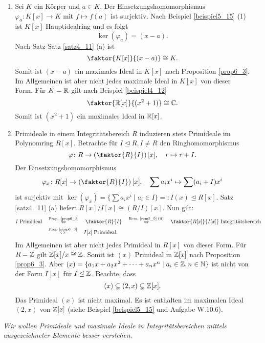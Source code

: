 \begin{beispiel}\label{beispiel6_5}
	\begin{enumerate}[label=(\arabic*)]
		\item Sei $K$ ein Körper und $a \in K$. Der Einsetzungshomomorphismus $\varphi_a \colon K[x] \to K$ mit $f \mapsto f(a)$ ist surjektiv. Nach Beispiel \ref{beispiel5_15} (1) ist $K[x]$ Hauptidealring und es folgt
		\[\ker(\varphi_a) = (x-a).\]
		Nach Satz Satz \ref{satz4_11} (a) ist
		\[\faktor{K[x]}{(x-a)} \cong K.\]
		Somit ist $(x-a)$ ein maximales Ideal in $K[x]$ nach Proposition \ref{prop6_3}. Im Allgemeinen ist aber nicht jedes maximale Ideal in $K[x]$ von dieser Form. Für $K = \mathbb{R}$ gilt nach Beispiel \ref{beispiel4_12} 
		\[\faktor{\R[x]}{(x^2 + 1)} \cong \C.\]
		Somit ist $(x^2 + 1)$ ein maximales Ideal in $\mathbb{R}[x]$.
		\item Primideale in einem Integritätsbereich $R$ induzieren stets Primideale im Polynomring $R[x]$. Betrachte für $I \unlhd R, I \neq R$ den Ringhomomorphismus
		\[\varphi \colon R \to \left(\faktor{R}{I}\right)[x],\quad r \mapsto r + I.\]
		Der Einsetzungshomomorphismus
		\[\varphi_x \colon R[x] \to \left(\faktor{R}{I}\right)[x], \quad \sum a_i x^i \mapsto \sum (a_i + I) x^i\]
		ist surjektiv mit $\ker(\varphi_x) = \{\sum a_i x^i \mid a_i \in I\} =: I(x) \unlhd R[x]$. Satz \ref{satz4_11} (a) liefert $R[x] / I[x] \cong (R/I)[x]$. Nun gilt:
		\begin{align*}I \;\text{Primideal}  \quad&\overset{\text{Prop. \ref{prop6_3}}}{\Leftrightarrow}\quad \faktor{R}{I}  \quad\overset{\text{Bem. \ref{rem5_9} (ii)}}{\Leftrightarrow}\quad \faktor{R[x]}{I[x]} \; \text{Integritätsbereich}\\
	  &\overset{\text{Prop \ref{prop6_3}}}{\Leftrightarrow}\quad I[x] \; \text{Primideal}.\end{align*}		
		Im Allgemeinen ist aber nicht jedes Primideal in $R[x]$ von dieser Form. Für $R=\mathbb{Z}$ gilt $\mathbb{Z}[x] / x \cong \mathbb{Z}$. Somit ist $(x)$ Primideal in $\mathbb{Z}[x]$ nach Proposition \ref{prop6_3}. Aber $(x) = \{a_1 x + a_2 x^2 + \dots + a_n x^n \mid a_i \in \mathbb{Z}, n \in \mathbb{N}\}$ ist nicht von der Form $I[x]$ für $I \unlhd \mathbb{Z}$. Beachte, dass 
		\begin{align*}
			(x) \subsetneq (2,x) \subsetneq \mathbb{Z}[x].
		\end{align*}
		Das Primideal $(x)$ ist nicht maximal. Es ist enthalten im maximalen Ideal $(2,x)$ von $\mathbb{Z}[x]$ (siehe Beispiel \ref{beispiel5_15} und Aufgabe W.10.6).
 	\end{enumerate} 
\end{beispiel}
{\Large \textit{Wir wollen Primideale und maximale Ideale in Integritätsbereichen mittels ausgezeichneter Elemente besser verstehen.}}


